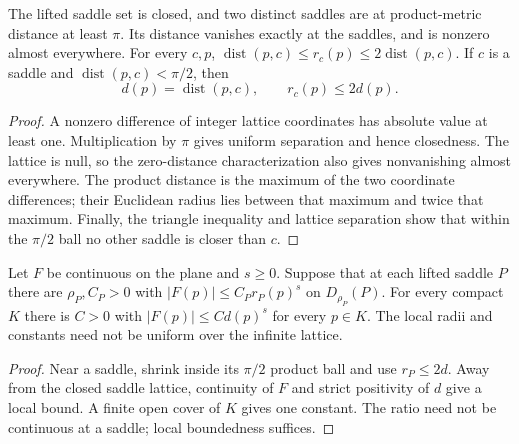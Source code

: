 \begin{lemma}
\label{lem:saddle-distance-comparison}
\leanok
The lifted saddle set is closed, and two distinct saddles are at product-metric
distance at least $\pi$. Its distance vanishes exactly at the saddles, and
is nonzero almost everywhere.
For every $c,p$,
$\operatorname{dist}(p,c)\le r_c(p)\le2\operatorname{dist}(p,c)$.
If $c$ is a saddle and $\operatorname{dist}(p,c)<\pi/2$, then
\[
 d(p)=\operatorname{dist}(p,c),\qquad r_c(p)\le2d(p).
\]
\end{lemma}

\begin{proof}
\leanok
A nonzero difference of integer lattice coordinates has absolute value at
least one. Multiplication by $\pi$ gives uniform separation and hence
closedness. The lattice is null, so the zero-distance characterization
also gives nonvanishing almost everywhere.
The product distance is the maximum of the two coordinate differences;
their Euclidean radius lies between that maximum and twice that maximum.
Finally, the triangle inequality and lattice separation show that within
the $\pi/2$ ball no other saddle is closer than $c$.
\end{proof}

\begin{lemma}
\label{lem:saddle-growth-compact-bound}
\leanok
Let $F$ be continuous on the plane and $s\ge0$. Suppose that at each lifted
saddle $P$ there are $\rho_P,C_P>0$ with
$|F(p)|\le C_P r_P(p)^s$ on $D_{\rho_P}(P)$.
For every compact $K$ there is $C>0$ with
$|F(p)|\le C d(p)^s$ for every $p\in K$.
The local radii and constants need not be uniform over the infinite lattice.
\end{lemma}

\begin{proof}
\leanok
Near a saddle, shrink inside its $\pi/2$ product ball and use
$r_P\le2d$. Away from the closed saddle lattice, continuity of $F$ and
strict positivity of $d$ give a local bound.
A finite open cover of $K$ gives one constant.
The ratio need not be continuous at a saddle; local boundedness suffices.
\end{proof}

